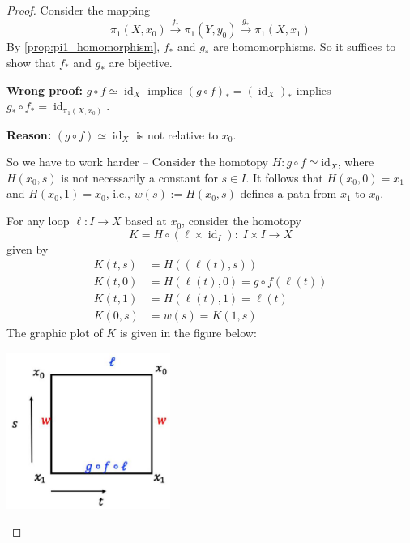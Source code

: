 \begin{proof} Consider the mapping
\[
{\pi }_{1}\left( {X,{x}_{0}}\right) \overset{{f}_{ * }}{ \rightarrow  }{\pi }_{1}\left( {Y,{y}_{0}}\right) \overset{{g}_{ * }}{ \rightarrow  }{\pi }_{1}\left( {X,{x}_{1}}\right)
\]
By \autoref{prop:pi1_homomorphism}, \({f}_{ * }\) and \({g}_{ * }\) are homomorphisms. So it suffices to show that \({f}_{ * }\) and \({g}_{ * }\) are bijective.

{\bf Wrong proof:} \(g \circ  f \simeq  {\operatorname{id}}_{X}\) implies \({\left( g \circ  f\right) }_{ * } = {\left( {\operatorname{id}}_{X}\right) }_{ * }\) implies \({g}_{ * } \circ  {f}_{ * } = {\operatorname{id}}_{{\pi }_{1}\left( {X,{x}_{0}}\right) }\).

{\bf Reason:} \(\left( {g \circ  f}\right)  \simeq  {\operatorname{id}}_{X}\) is not relative to \({x}_{0}\).

So we have to work harder -- Consider the homotopy \(H : g \circ  f \simeq  {\mathrm{{id}}}_{X}\), where \(H\left( {{x}_{0},s}\right)\) is not necessarily a constant for \(s \in  I\). It follows that \(H\left( {{x}_{0},0}\right)  = {x}_{1}\) and \(H\left( {{x}_{0},1}\right)  = {x}_{0}\), i.e., \(w\left( s\right)  \mathrel{\text{ := }} H\left( {{x}_{0},s}\right)\) defines a path from \({x}_{1}\) to \({x}_{0}\).

For any loop \(\ell  : I \rightarrow  X\) based at \({x}_{0}\), consider the homotopy
\[
K = H \circ  \left( {\ell  \times  {\operatorname{id}}_{I}}\right)  : \;I \times  I \rightarrow  X
\]
given by
\begin{align*}
K\left( {t,s}\right)  &= H\left( \left( {\ell \left( t\right),s}\right) \right) \\
K\left( {t,0}\right)  &= H\left( {\ell \left( t\right),0}\right)  = g \circ  f\left( {\ell \left( t\right) }\right)
\\
K\left( {t,1}\right) &= H\left( {\ell \left( t\right),1}\right)  = \ell \left( t\right)
\\
K\left( {0,s}\right)  &= w\left( s\right)  = K\left( {1,s}\right)
\end{align*}
The graphic plot of \(K\) is given in the figure below:
\begin{center}
\includegraphics[width=0.4\textwidth]{images/Ch7_K_homotopy.jpg}
\end{center}


\end{proof}
